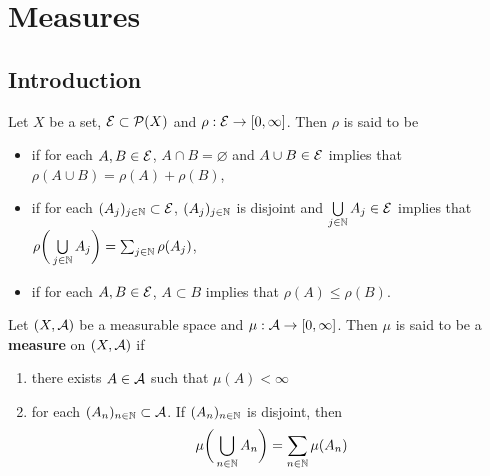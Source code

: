 \documentclass{book}
\begin{document}
	
	
	
	
	
	
	
	
	
	
	
	
	
	
	
	
	
	
	
	\newpage
	\chapter{Measures}
	
	\section{Introduction}
	
	
	
	\begin{defn} 
		Let $X$ be a set, $\mathcal{E} \subset \mathcal{P}(X)$ and $\rho: \mathcal{E} \rightarrow [0,\infty]$. Then $\rho$ is said to be 
		\begin{itemize}
			\item {} if for each $A, B \in \mathcal{E}$, $A \cap B = \varnothing$ and $A \cup B \in \mathcal{E}$ implies that $\rho(A \cup B) = \rho(A) + \rho(B)$,
			\item {} if for each $(A_j)_{j \in \mathbb{N}} \subset \mathcal{E}$, $(A_j)_{j \in \mathbb{N}}$ is disjoint and $\bigcup\limits_{j \in \mathbb{N}} A_j \in \mathcal{E}$ implies that $\rho \bigg( \bigcup\limits_{j \in \mathbb{N}} A_j \bigg) = \sum_{j \in \mathbb{N}} \rho(A_j)$,
			\item {} if for each $A, B \in \mathcal{E}$, $A \subset B$ implies that $\rho(A) \leq \rho(B)$.
		\end{itemize}
	\end{defn}
	
	\begin{defn} 
		Let $(X, \mathcal{A})$ be a measurable space and $\mu:\mathcal{A} \rightarrow [0,\infty]$. Then $\mu$ is said to be a \textbf{measure} on $(X, \mathcal{A})$ if 
		\begin{enumerate}
			\item there exists $A \in \mathcal{A}$ such that $\mu(A)< \infty$
			\item for each $(A_n)_{n \in \mathbb{N}} \subset \mathcal{A}$. If $(A_n)_{n \in \mathbb{N}}$ is disjoint, then $$\mu\bigg(\bigcup_{n \in \mathbb{N}}A_n \bigg) = \sum_{n \in \mathbb{N}}\mu(A_n)$$
		\end{enumerate}
	\end{defn}
	
\end{document}
